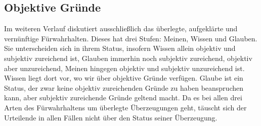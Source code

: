 \subsection{Objektive Gründe}\label{subsection:ObjektiveGruende}
Im weiteren Verlauf diskutiert  ausschließlich das
überlegte, aufgeklärte und vernünftige Fürwahrhalten. Dieses hat drei Stufen:
Meinen, Wissen und Glauben. Sie unterscheiden sich in ihrem Status, insofern
Wissen allein objektiv und subjektiv zureichend ist, Glauben immerhin noch
subjektiv zureichend, objektiv aber unzureichend, Meinen hingegen objektiv und
subjektiv unzureichend ist. Wissen liegt dort vor, wo wir über objektive Gründe
verfügen. Glaube ist ein Status, der zwar keine objektiv zureichenden Gründe zu
haben beanspruchen kann, aber subjektiv zureichende Gründe geltend macht.
Da es bei allen drei Arten des Fürwahrhaltens um überlegte Überzeugungen geht, täuscht
sich der Urteilende in allen Fällen nicht über den Status seiner Überzeugung.

